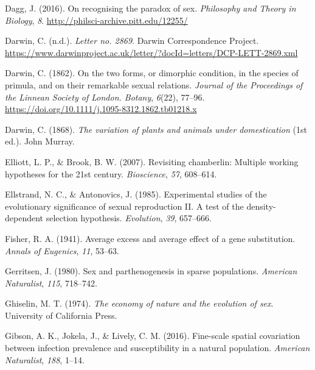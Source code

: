 \documentclass[
  letterpaper,
]{book}
\newlength{\cslhangindent}
\newlength{\cslentryspacingunit} %
\newenvironment{CSLReferences}[2] %
 {%
  \setlength{\parindent}{0pt}
  \ifodd #1
  \let\oldpar\par
  \def\par{\hangindent=\cslhangindent\oldpar}
  \fi
  \setlength{\parskip}{#2\cslentryspacingunit}
 }%
 {}
\begin{document}
\begin{CSLReferences}{1}{0}
\leavevmode{}%
Dagg, J. (2016). On recognising the paradox of sex. \emph{Philosophy and
Theory in Biology}, \emph{8}.
\url{http://philsci-archive.pitt.edu/12255/}

\leavevmode{}%
Darwin, C. (n.d.). \emph{Letter no. 2869}. Darwin Correspondence
Project.
\url{https://www.darwinproject.ac.uk/letter/?docId=letters/DCP-LETT-2869.xml}

\leavevmode{}%
Darwin, C. (1862). On the two forms, or dimorphic condition, in the
species of primula, and on their remarkable sexual relations.
\emph{Journal of the Proceedings of the Linnean Society of London.
Botany}, \emph{6}(22), 77--96.
\url{https://doi.org/10.1111/j.1095-8312.1862.tb01218.x}

\leavevmode{}%
Darwin, C. (1868). \emph{The variation of plants and animals under
domestication} (1st ed.). John Murray.

\leavevmode{}%
Elliott, L. P., \& Brook, B. W. (2007). Revisiting chamberlin: Multiple
working hypotheses for the 21st century. \emph{Bioscience}, \emph{57},
608--614.

\leavevmode{}%
Ellstrand, N. C., \& Antonovics, J. (1985). Experimental studies of the
evolutionary significance of sexual reproduction II. A test of the
density-dependent selection hypothesis. \emph{Evolution}, \emph{39},
657--666.

\leavevmode{}%
Fisher, R. A. (1941). Average excess and average effect of a gene
substitution. \emph{Annals of Eugenics}, \emph{11}, 53--63.

\leavevmode{}%
Gerritsen, J. (1980). Sex and parthenogenesis in sparse populations.
\emph{American Naturalist}, \emph{115}, 718--742.

\leavevmode{}%
Ghiselin, M. T. (1974). \emph{The economy of nature and the evolution of
sex}. University of California Press.

\leavevmode{}%
Gibson, A. K., Jokela, J., \& Lively, C. M. (2016). Fine-scale spatial
covariation between infection prevalence and susceptibility in a natural
population. \emph{American Naturalist}, \emph{188}, 1--14.


\end{CSLReferences}
\end{document}
